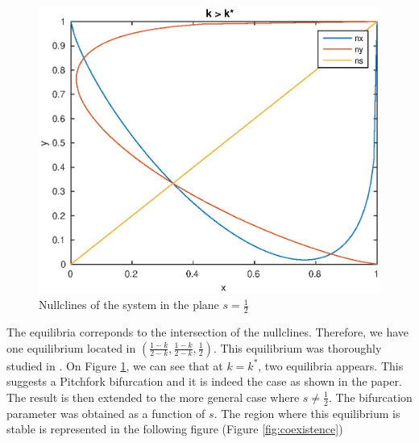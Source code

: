 \documentclass{article}
\begin{document}
\begin{figure}[H]
\includegraphics[scale=0.5]{nullpg.eps}
\caption{Nullclines of the system in the plane $s=\frac{1}{2}$}
\label{fig:nullclines}
\end{figure}

The equilibria correponds to the intersection of the nullclines.
Therefore, we have one equilibrium located in $(\frac{1-k}{2-k}, \frac{1-k}{2-k}, \frac{1}{2})$.
This equilibrium was thoroughly studied in \cite{bilingual}.
On Figure \ref{fig:nullclines}, we can see that at $k=k^{\ast}$, two equilibria appears.
This suggests a Pitchfork bifurcation and it is indeed the case as shown in the paper.
The result is then extended to the more general case where $s \ne \frac{1}{2}$.
The bifurcation parameter was obtained as a function of $s$.
The region where this equilibrium is stable is represented in the following figure (Figure \ref{fig:coexistence})
\end{document}
